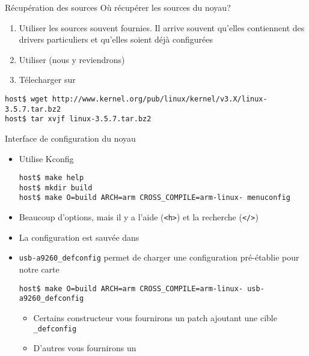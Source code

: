 \begin{frame}[fragile=singleslide]{Récupération des sources}
  Où récupérer les sources du noyau?
  \begin{enumerate}
  \item Utiliser  les sources souvent fournies.  Il arrive souvent
    qu'elles  contiennent  des  drivers particuliers  et  qu'elles
    soient déjà configurées
  \item Utiliser  (nous y reviendrons)
  \item Télecharger sur 
  \end{enumerate}
  \begin{lstlisting}
host$ wget http://www.kernel.org/pub/linux/kernel/v3.X/linux-3.5.7.tar.bz2
host$ tar xvjf linux-3.5.7.tar.bz2
  \end{lstlisting}
\end{frame}

\begin{frame}[fragile=singleslide]{Interface de configuration du noyau}
  \begin{itemize}
    \item Utilise Kconfig
      \begin{lstlisting}
host$ make help
host$ mkdir build
host$ make O=build ARCH=arm CROSS_COMPILE=arm-linux- menuconfig
       \end{lstlisting}
     \item  Beaucoup d'options,  mais il  y a  l'aide (\verb+<h>+)  et la
       recherche (\verb+</>+)
    \item La configuration est sauvée dans 
    \item    \verb+usb-a9260_defconfig+   permet   de    charger   une
      configuration pré-établie pour notre carte
      \begin{lstlisting}
host$ make O=build ARCH=arm CROSS_COMPILE=arm-linux- usb-a9260_defconfig
      \end{lstlisting}
    \begin{itemize}
    \item Certains constructeur vous  fournirons un patch ajoutant une
      cible \verb+_defconfig+
    \item D'autres vous fournirons un 
    \end{itemize}
  \end{itemize}
\end{frame}

